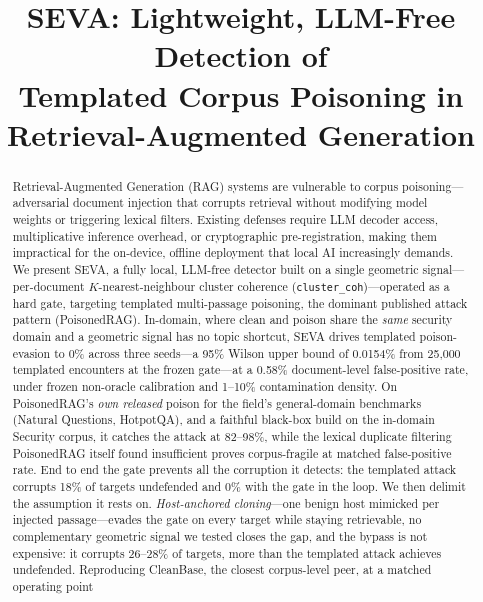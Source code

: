 \documentclass[10pt,journal,compsoc]{IEEEtran}
\begin{document}
\title{SEVA: Lightweight, LLM-Free Detection of\\
Templated Corpus Poisoning in\\
Retrieval-Augmented Generation}

\author{
}

\maketitle

\begin{abstract}
Retrieval-Augmented Generation (RAG) systems are vulnerable to corpus
poisoning---adversarial document injection that corrupts retrieval without
modifying model weights or triggering lexical filters. Existing defenses
require LLM decoder access, multiplicative inference overhead, or cryptographic
pre-registration, making them impractical for the on-device, offline deployment
that local AI increasingly demands. We present SEVA, a fully local, LLM-free
detector built on a single geometric signal---per-document $K$-nearest-neighbour
cluster coherence (\texttt{cluster\_coh})---operated as a hard gate, targeting
templated multi-passage poisoning, the dominant published attack pattern
(PoisonedRAG). In-domain, where clean and poison share the \emph{same} security domain
and a geometric signal has no topic shortcut, SEVA drives templated poison-evasion to
0\% across three seeds---a 95\% Wilson upper bound of 0.0154\% from 25{,}000 templated
encounters at the frozen gate---at a 0.58\% document-level false-positive rate, under
frozen non-oracle calibration and 1--10\% contamination density. On PoisonedRAG's
\emph{own released} poison for the field's general-domain benchmarks (Natural Questions,
HotpotQA), and a faithful black-box build on the in-domain Security corpus, it catches
the attack at 82--98\%, while the lexical duplicate filtering PoisonedRAG itself found
insufficient proves corpus-fragile at matched false-positive rate. End to end the gate prevents
all the corruption it detects: the templated attack corrupts 18\% of targets undefended and 0\%
with the gate in the loop. We then delimit the assumption it rests on. \emph{Host-anchored
cloning}---one benign host mimicked per injected passage---evades the gate on every target while
staying retrievable, no complementary geometric signal we tested closes the gap, and the bypass
is not expensive: it corrupts 26--28\% of targets, more than the templated attack achieves
undefended. Reproducing CleanBase, the closest corpus-level peer, at a matched operating point

\end{abstract}
\end{document}
